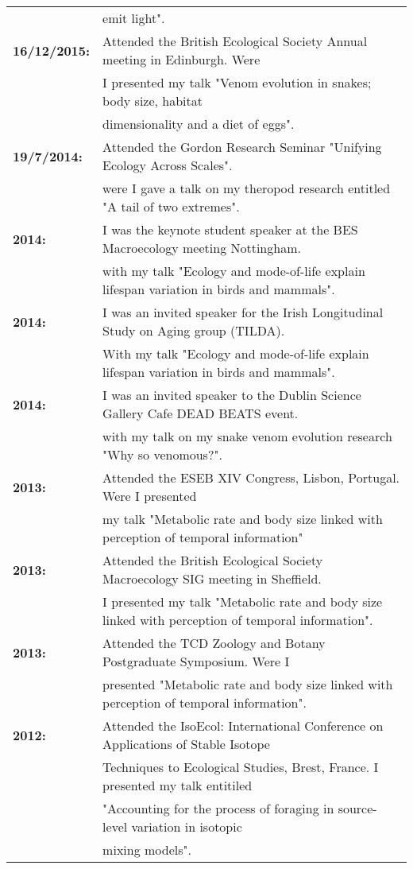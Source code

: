 \documentclass[10pt,a4paper]{article}
\begin{document}
\begin{tabular}{ll}
& emit light".\\
\textbf{16/12/2015:} & Attended the British Ecological Society Annual meeting in Edinburgh. Were\\ 
& I presented my talk "Venom evolution in snakes; body size, habitat\\
& dimensionality and a diet of eggs".\\
\textbf{19/7/2014:} & Attended the Gordon Research Seminar "Unifying Ecology Across Scales".\\ 
& were I gave a talk on my theropod research entitled "A tail of two extremes".\\
\textbf{2014:} & I was the keynote student speaker at the BES Macroecology meeting Nottingham.\\ 
& with my talk "Ecology and mode-of-life explain lifespan variation in birds and mammals".\\
\textbf{2014:} & I was an invited speaker for the Irish Longitudinal Study on Aging group (TILDA).\\ 
& With my talk "Ecology and mode-of-life explain lifespan variation in birds and mammals".\\
\textbf{2014:} & I was an invited speaker to the Dublin Science Gallery Cafe DEAD BEATS event.\\ 
& with my talk on my snake venom evolution research "Why so venomous?".\\
\textbf{2013:} & Attended the ESEB XIV Congress, Lisbon, Portugal. Were I presented\\
& my talk "Metabolic rate and body size linked with perception of temporal information"\\
\textbf{2013:} & Attended the British Ecological Society Macroecology SIG meeting in Sheffield.\\
& I presented my talk "Metabolic rate and body size linked with perception of temporal information".\\
\textbf{2013:} & Attended the TCD Zoology and Botany Postgraduate Symposium. Were I\\
& presented "Metabolic rate and body size linked with perception of temporal information".\\
\textbf{2012:} & Attended the IsoEcol: International Conference on Applications of Stable Isotope\\
&Techniques to Ecological Studies, Brest, France. I presented my talk entitiled\\
&"Accounting for the process of foraging in source-level variation in isotopic\\
& mixing models".\\


\end{tabular}
\end{document}
